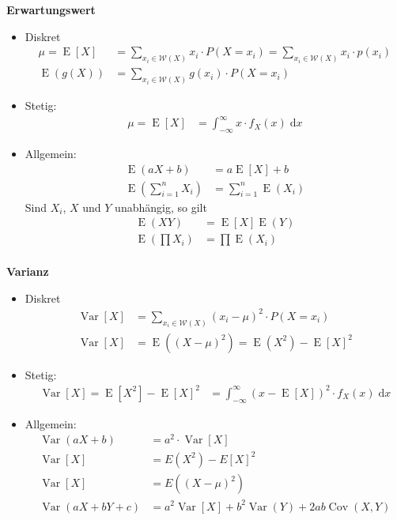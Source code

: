 \documentclass[25pt]{sciposter}
\newcommand{\Var}{\operatorname{Var}}
\newcommand{\E}{\operatorname{E}}
\newcommand{\rmd}{\mathrm{d}}
\newenvironment{method}[1]{\begin{mdframed}[backgroundcolor=blue!10,innertopmargin=15pt, innerbottommargin=15pt,nobreak=true]
		\textbf{#1 }
	}
	{ 
	\end{mdframed}
}
\begin{document}
\begin{multicols}{3}
\begin{method}{Erwartungswert}
	\begin{itemize}
		\item Diskret
		\begin{align*}
	\mu = \E[X] &= \sum_{x_i \in \mathcal{W}(X)} x_i \cdot P(X=x_i) = \sum_{x_i \in \mathcal{W}(X)} x_i \cdot p(x_i) \\
	\E(g(X)) &= \sum_{x_i \in \mathcal{W}(X)} g(x_i) \cdot P(X=x_i)
	\end{align*}
		\item Stetig:
\begin{align*}
\mu = \E[X] &= \int_{-\infty}^{\infty} x \cdot f_X(x) \; \rmd x
\end{align*}
		
		\item Allgemein:
		\begin{align*}
	\E(aX+b) &= a\E[X] + b\\
	\E \left( \sum_{i=1}^n X_i \right) &= \sum_{i=1}^n \E(X_i)
		\end{align*}	
		Sind $X_i$, $X$ und $Y$ unabhängig, so gilt
		\begin{align*}
		\E(XY) &= \E[X]\E(Y)\\
		\E \left( \prod X_i \right) &= \prod \E(X_i)\\
		\end{align*}
		
	\end{itemize}
	

\end{method}


\begin{method}{Varianz}
\begin{itemize}
\item Diskret
		\begin{align*}
		\Var[X] &= \sum_{x_i \in \mathcal{W}(X)} (x_i - \mu)^2 \cdot P(X=x_i) \\
\Var[X] &= \E((X - \mu)^2) = \E(X^2) - \E[X]^2
	\end{align*}
\item Stetig:
	\begin{align*}
\Var[X] =  \E{[X^2]} - \E{[X]}^2  &= \int_{-\infty}^{\infty} (x - \E[X])^2 \cdot f_X(x) \; \rmd x
\end{align*}

\item Allgemein:
\begin{align*}
	\Var(aX+b) &= a^2 \cdot \Var[X]\\
	\Var[X] &= E(X^2)-E[X]^2\\
	\Var[X] &= E((X-\mu)^2)\\
	\Var(aX+bY+c) &= a^2\Var[X] +b^2\Var(Y) + 2 ab \operatorname{Cov}(X,Y)
\end{align*}



\end{itemize}
\end{method}
\end{multicols}
\end{document}
